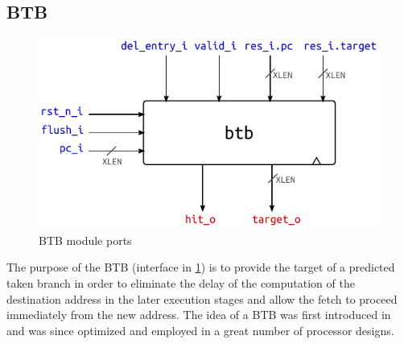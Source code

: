 \pagebreak
\subsection{\acf{BTB}}\label{sec:btb}
\begin{figure}[hbt]
  \centering
  \includegraphics{img/btb-top.pdf}
  \caption{\acs{BTB} module ports}
  \label{fig:btb-top}
\end{figure}
The purpose of the \ac{BTB} (interface in \cref{fig:btb-top}) is to provide the target of a predicted taken branch in order to eliminate the delay of the computation of the destination address in the later execution stages and allow the fetch to proceed immediately from the new address. The idea of a \ac{BTB} was first introduced in \cite{lee84} and was since optimized and employed in a great number of processor designs.

